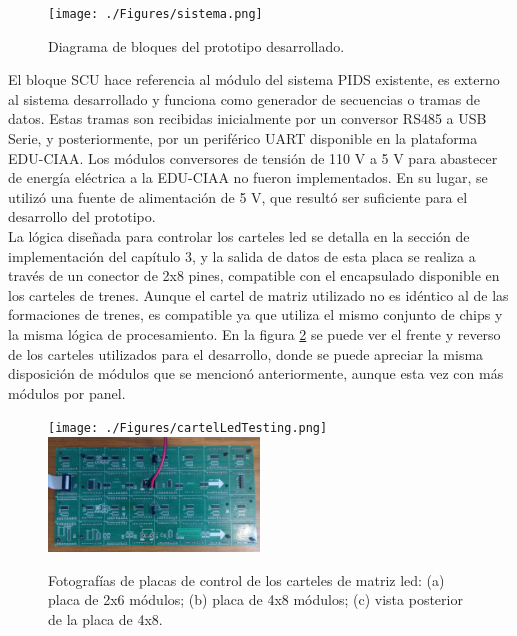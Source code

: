 \begin{figure}[H]
	\centering
	\texttt{[image: ./Figures/sistema.png]}
	\caption{Diagrama de bloques del prototipo desarrollado.}
	\label{fig:sistema}
\end{figure}

El bloque SCU hace referencia al módulo del sistema PIDS existente, es externo al sistema desarrollado y funciona como generador de secuencias o tramas de datos. Estas tramas son recibidas inicialmente por un conversor RS485 a USB Serie, y posteriormente, por un periférico UART disponible en la plataforma EDU-CIAA. Los módulos conversores de tensión de 110 V a 5 V para abastecer de energía eléctrica a la EDU-CIAA no fueron implementados. En su lugar, se utilizó una fuente de alimentación de 5 V, que resultó ser suficiente para el desarrollo del prototipo. \\

La lógica diseñada para controlar los carteles led se detalla en la sección de implementación del capítulo 3, y la salida de datos de esta placa se realiza a través de un conector de 2x8 pines, compatible con el encapsulado disponible en los carteles de trenes. Aunque el cartel de matriz utilizado no es idéntico al de las formaciones de trenes, es compatible ya que utiliza el mismo conjunto de chips y la misma lógica de procesamiento. En la figura \ref{fig:picsDriverled} se puede ver el frente y reverso de los carteles utilizados para el desarrollo, donde se puede apreciar la misma disposición de módulos que se mencionó anteriormente, aunque esta vez con más módulos por panel. \\


\begin{figure}[H]
	\centering
	\texttt{[image: ./Figures/cartelLedTesting.png]}\\
	\includegraphics[width=0.5\textwidth, angle=90]{./Figures/cartel4x8.jpg}\\
	\caption{Fotografías de placas de control de los carteles de matriz led: (a) placa de 2x6 módulos; (b) placa de 4x8 módulos; (c) vista posterior de la placa de 4x8.}
	\label{fig:picsDriverled}
\end{figure}

